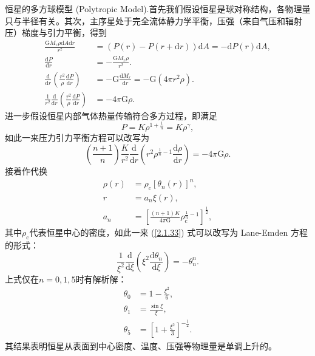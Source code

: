 \documentclass[../天体物理基础.tex]{subfiles}
\begin{document}
恒星的多方球模型 (Polytropic Model).首先我们假设恒星是球对称结构，各物理量只与半径有关。其次，主序星处于完全流体静力学平衡，压强（来自气压和辐射压）梯度与引力平衡，得到
\begin{align}
\frac{\mathrm{G}M_{r}\rho\mathrm{d}A\mathrm{d}r}{r^{2}}&=\left(P\left(r\right)-P\left(r+\mathrm{d}r\right)\right)\mathrm{d}A=-\mathrm{d}P\left(r\right)\mathrm{d}A,\\
\frac{\mathrm{d}P}{\mathrm{d}r}&=-\frac{\mathrm{G}M_{r}\rho}{r^{2}}.\\
\frac{\mathrm{d}}{\mathrm{d}r}\left(\frac{r^{2}}{\rho}\frac{\mathrm{d}P}{\mathrm{d}r}\right)&=-\mathrm{G}\frac{\mathrm{d}M_{r}}{\mathrm{d}r}=-\mathrm{G}\left(4\pi r^{2}\rho\right).\\
\frac{1}{r^{2}}\frac{\mathrm{d}}{\mathrm{d}r}\left(\frac{r^{2}}{\rho}\frac{\mathrm{d}P}{\mathrm{d}r}\right)&=-4\pi{}\mathrm{G}\rho.
\end{align}
进一步假设恒星内部气体热量传输符合多方过程，即满足
\begin{equation}
P=K\rho^{1+\frac{1}{n}}=K\rho^{\gamma},
\end{equation}
如此一来压力引力平衡方程可以改写为
\begin{equation}
\left(\frac{n+1}{n}\right)\frac{K}{r^{2}}\frac{\mathrm{d}}{\mathrm{d}r}\left(r^{2}\rho^{\frac{1}{n}-1}\frac{\mathrm{d}\rho}{\mathrm{d}r}\right)=-4\pi\mathrm{G}\rho.\label{2.1.33}
\end{equation}
接着作代换
\begin{align}
\rho\left(r\right)&=\rho_{\text{c}}\left[\theta_{n}\left(r\right)\right]^{n},\\
r&=a_{n}\xi\left(r\right),\\
a_{n}&=\left[\frac{\left(n+1\right)K}{4\pi\mathrm{G}}\rho_{\text{c}}^{\frac{1}{n}-1}\right]^{\frac{1}{2}},
\end{align}
其中$\rho_{\text{c}}$代表恒星中心的密度，如此一来 (\ref{2.1.33}) 式可以改写为 Lane-Emden 方程的形式：
\begin{equation}
\frac{1}{\xi^{2}}\frac{\mathrm{d}}{\mathrm{d}\xi}\left(\xi^{2}\frac{\mathrm{d}\theta_{n}}{\mathrm{d}\xi}\right)=-\theta_{n}^{n}.
\end{equation}
上式仅在$n=0,1,5$时有解析解：
\begin{align}
\theta_{0}&=1-\frac{\xi^{2}}{6},\\
\theta_{1}&=\frac{\sin\xi}{\xi},\\
\theta_{5}&=\left[1+\frac{\xi^{2}}{3}\right]^{-\frac{1}{2}}.
\end{align}
其结果表明恒星从表面到中心密度、温度、压强等物理量是单调上升的。
\end{document}
